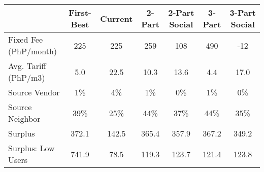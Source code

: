 \begin{tabular}{lcccccc}
  & First-Best & Current & 2-Part  & 2-Part Social  & 3-Part & 3-Part Social \\
\hline
\hline
Fixed Fee (PhP/month) &225&225&259&108&490&-12\\
Avg. Tariff (PhP/m3) &5.0&22.5&10.3&13.6&4.4&17.0\\
Source Vendor &1\% &4\% &1\% &0\% &1\% &0\%\\
Source Neighbor &39\% &25\% &44\% &37\% &44\% &35\%\\
Surplus &372.1&142.5&365.4&357.9&367.2&349.2\\
Surplus: Low Users &741.9&78.5&119.3&123.7&121.4&123.8\\
\hline
\end{tabular}
